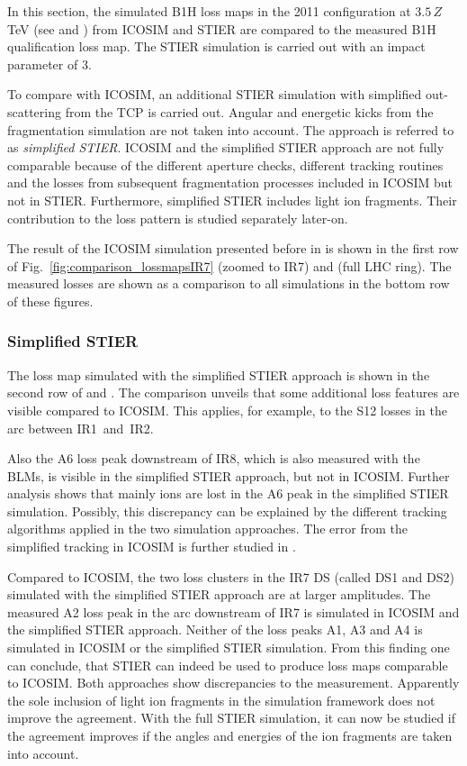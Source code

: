 In this section, the simulated B1H loss maps in the 2011 configuration at $3.5\,Z\,$TeV (see  and ) from ICOSIM and STIER are compared to the measured B1H qualification loss map. The STIER simulation is carried out with an impact parameter of $3$\mum. 

To compare with ICOSIM, an additional STIER simulation with simplified out-scattering from the TCP is carried out. Angular and energetic kicks from the fragmentation simulation are not taken into account. The approach is referred to as \textit{simplified STIER}. ICOSIM and the simplified STIER approach are not fully comparable because of the different aperture checks, different tracking routines and the losses from subsequent fragmentation processes included in ICOSIM but not in STIER. Furthermore, simplified STIER includes light ion fragments. Their contribution to the loss pattern is studied separately later-on. 

The result of the ICOSIM simulation presented before in  is shown in the first row of Fig.~\ref{fig:comparison_lossmapsIR7} (zoomed to IR7) and  (full LHC ring). The measured losses are shown as a comparison to all simulations in the bottom row of these figures.

\subsubsection{Simplified STIER}

The loss map simulated with the simplified STIER approach is shown in the second row of  and . The comparison unveils that some additional loss features are visible compared to ICOSIM. This applies, for example, to the S12 losses in the arc between \mbox{IR1 and IR2}. 

Also the A6 loss peak downstream of IR8, which is also measured with the BLMs, is visible in the simplified STIER approach, but not in ICOSIM. Further analysis shows that mainly  ions are lost in the A6 peak in the simplified STIER simulation. Possibly, this discrepancy can be explained by the different tracking algorithms applied in the two simulation approaches. The error from the simplified tracking in ICOSIM is further studied in .

Compared to ICOSIM, the two loss clusters in the IR7 DS (called DS1 and DS2) simulated with the simplified STIER approach are at larger amplitudes. The measured A2 loss peak in the arc downstream of IR7 is simulated in ICOSIM and the simplified STIER approach. Neither of the loss peaks A1, A3 and A4 is simulated in ICOSIM or the simplified STIER simulation. From this finding one can conclude, that STIER can indeed be used to produce loss maps comparable to ICOSIM. Both approaches show discrepancies to the measurement. Apparently the sole inclusion of light ion fragments in the simulation framework does not improve the agreement. With the full STIER simulation, it can now be studied if the agreement improves if the angles and energies of the ion fragments are taken into account.

